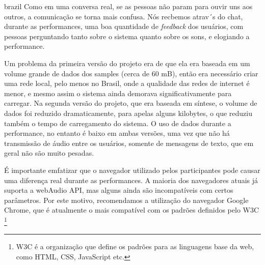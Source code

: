 \begin{otherlanguage*}{brazil}
Como em uma conversa real, se as pessoas não param para ouvir uns aos outros, a comunicação se torna mais confusa. Nós recbemos atrav´s do chat, durante as performances, uma boa quantidade de \emph{feedback} dos usuários, com pessoas perguntando tanto sobre o sistema quanto sobre os sons, e elogiando a performance.



Um problema da primeira versão do projeto era de que ela era baseada em um volume grande de dados dos samples (cerca de 60 mB), então era necessário criar uma rede local, pelo menos no Brasil, onde a qualidade das redes de internet é menor, e mesmo assim o sistema ainda demorava significativamente para carregar. Na segunda versão do projeto, que era baseada em síntese, o volume de dados foi reduzido dramaticamente, para apelas alguns kilobytes, o que reduziu também o tempo de carregamento do sistema. O uso de dados durante a performance, no entanto é baixo em ambas versões, uma vez que não há transmissão de áudio entre os usuários, somente de mensagens de texto, que em geral não são muito pesadas. 


É importante emfatizar que o navegador utilizado pelos participantes pode causar uma diferença real durante as performances. A maioria dos navegadores atuais já suporta a webAudio API, mas alguns ainda são incompatíveis com certos parâmetros. Por este motivo, recomendamos a utilização do navegador Google Chrome, que é atualmente o mais compatível com os padrões definidos pelo W3C \footnote{W3C é a organização que define os padrões para as linguagens base da web, como HTML, CSS, JavaScript etc.}



\end{otherlanguage*}
